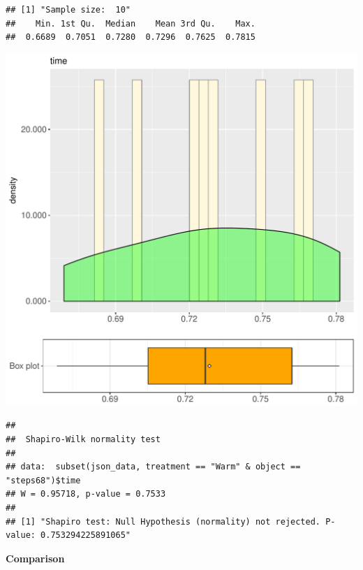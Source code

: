 \documentclass{article}\usepackage[]{graphicx}\usepackage[]{color}
\makeatletter
\def\maxwidth{ %
  \ifdim\Gin@nat@width>\linewidth
    \linewidth
  \else
    \Gin@nat@width
  \fi
}
\newenvironment{kframe}{%
 \def\at@end@of@kframe{}%
 \ifinner\ifhmode%
  \def\at@end@of@kframe{\end{minipage}}%
  \begin{minipage}{\columnwidth}%
 \fi\fi%
 \def\FrameCommand##1{\hskip\@totalleftmargin \hskip-\fboxsep
 \colorbox{shadecolor}{##1}\hskip-\fboxsep
     \hskip-\linewidth \hskip-\@totalleftmargin \hskip\columnwidth}%
 \MakeFramed {\advance\hsize-\width
   \@totalleftmargin\z@ \linewidth\hsize
   \@setminipage}}%
 {\par\unskip\endMakeFramed%
 \at@end@of@kframe}
\newenvironment{knitrout}{}{} %
\makeatother
\begin{document}
\begin{knitrout}
\color{fgcolor}\begin{kframe}
\begin{verbatim}
## [1] "Sample size:  10"
##    Min. 1st Qu.  Median    Mean 3rd Qu.    Max. 
##  0.6689  0.7051  0.7280  0.7296  0.7625  0.7815
\end{verbatim}
\end{kframe}
\includegraphics[width=\maxwidth]{figure/RH1_Warm_steps68-1} 
\begin{kframe}\begin{verbatim}
## 
## 	Shapiro-Wilk normality test
## 
## data:  subset(json_data, treatment == "Warm" & object == "steps68")$time
## W = 0.95718, p-value = 0.7533
## 
## [1] "Shapiro test: Null Hypothesis (normality) not rejected. P-value: 0.753294225891065"
\end{verbatim}
\end{kframe}
\end{knitrout}
  
 \textbf{Comparison}
  
\end{document}
